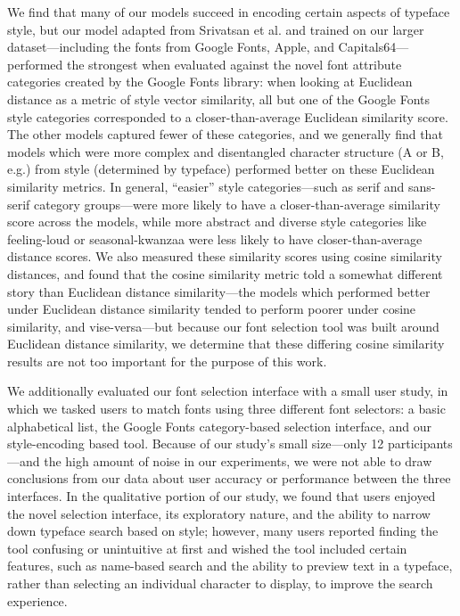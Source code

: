 We find that many of our models succeed in encoding certain aspects of typeface style, but our model adapted from Srivatsan et al. \cite{srivatsan2020} and trained on our larger dataset---including the fonts from Google Fonts, Apple, and Capitals64---performed the strongest when evaluated against the novel font attribute categories created by the Google Fonts library: when looking at Euclidean distance as a metric of style vector similarity, all but one of the Google Fonts style categories corresponded to a closer-than-average Euclidean similarity score. The other models captured fewer of these categories, and we generally find that models which were more complex and disentangled character structure (A or B, e.g.) from style (determined by typeface) performed better on these Euclidean similarity metrics. In general, ``easier'' style categories---such as serif and sans-serif category groups---were more likely to have a closer-than-average similarity score across the models, while more abstract and diverse style categories like feeling-loud or seasonal-kwanzaa were less likely to have closer-than-average distance scores. We also measured these similarity scores using cosine similarity distances, and found that the cosine similarity metric told a somewhat different story than Euclidean distance similarity---the models which performed better under Euclidean distance similarity tended to perform poorer under cosine similarity, and vise-versa---but because our font selection tool was built around Euclidean distance similarity, we determine that these differing cosine similarity results are not too important for the purpose of this work.

We additionally evaluated our font selection interface with a small user study, in which we tasked users to match fonts using three different font selectors: a basic alphabetical list, the Google Fonts category-based selection interface, and our style-encoding based tool. Because of our study's small size---only 12 participants---and the high amount of noise in our experiments, we were not able to draw conclusions from our data about user accuracy or performance between the three interfaces. In the qualitative portion of our study, we found that users enjoyed the novel selection interface, its exploratory nature, and the ability to narrow down typeface search based on style; however, many users reported finding the tool confusing or unintuitive at first and wished the tool included certain features, such as name-based search and the ability to preview text in a typeface, rather than selecting an individual character to display, to improve the search experience.

